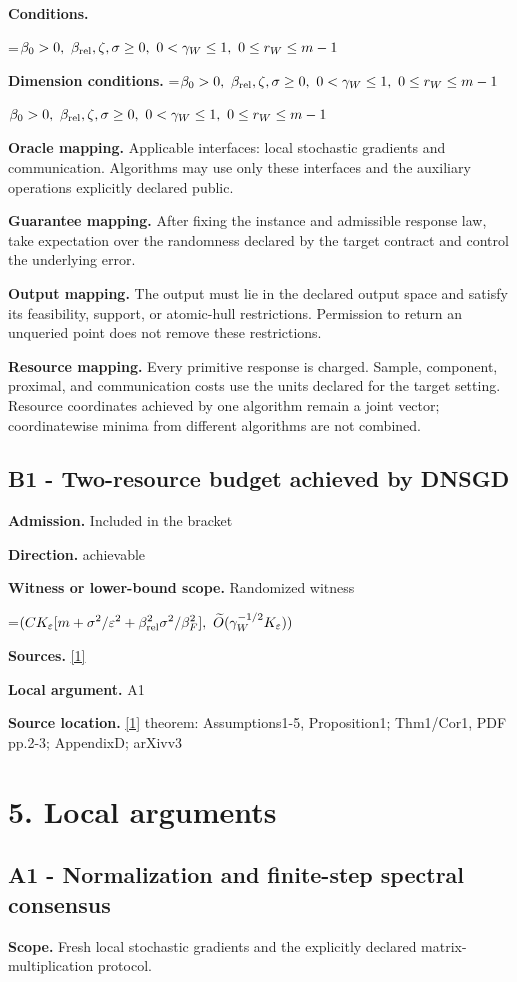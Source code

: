 \documentclass[10pt,a4paper]{article}
\newcommand{\AtlasMath}[1]{\par\begingroup\centering\setbox0=\hbox{$\displaystyle #1$}\ifdim\wd0>1.4\linewidth\typeout{ATLAS WIDE FORMULA: \the\wd0}\fi\ifdim\wd0>\linewidth\resizebox{\linewidth}{!}{\box0}\else\box0\fi\par\endgroup}
\newcommand{\AtlasInlineMath}[1]{\begingroup\setbox0=\hbox{$#1$}\ifdim\wd0>.4\linewidth\endgroup\AtlasMath{#1}\else\endgroup$#1$\fi}
\begin{document}
\textbf{Conditions.} 
\AtlasMath{\beta_0>0,\ \beta_{\rm rel},\zeta,\sigma\ge0,\ 0<\gamma_W\le1,\ 0\le r_W\le m-1}


\textbf{Dimension conditions.} \AtlasInlineMath{\beta_0>0,\ \beta_{\rm rel},\zeta,\sigma\ge0,\ 0<\gamma_W\le1,\ 0\le r_W\le m-1}

\textbf{Oracle mapping.} Applicable interfaces: local stochastic gradients and communication. Algorithms may use only these interfaces and the auxiliary operations explicitly declared public.

\textbf{Guarantee mapping.} After fixing the instance and admissible response law, take expectation over the randomness declared by the target contract and control the underlying error.

\textbf{Output mapping.} The output must lie in the declared output space and satisfy its feasibility, support, or atomic-hull restrictions. Permission to return an unqueried point does not remove these restrictions.

\textbf{Resource mapping.} Every primitive response is charged. Sample, component, proximal, and communication costs use the units declared for the target setting. Resource coordinates achieved by one algorithm remain a joint vector; coordinatewise minima from different algorithms are not combined.

\subsection{B1 - Two-resource budget achieved by DNSGD}
\textbf{Admission.} Included in the bracket

\textbf{Direction.} achievable

\textbf{Witness or lower-bound scope.} Randomized witness

\AtlasMath{(CK_\varepsilon[m+\sigma^2/\varepsilon^2+\beta_{\rm rel}^2\sigma^2/\beta_F^2],\ \widetilde{O}(\gamma_W^{-1/2}K_\varepsilon))}
\textbf{Sources.} \href{https://arxiv.org/pdf/2509.08726}{[1]}

\textbf{Local argument.} A1

\textbf{Source location.} \href{https://arxiv.org/pdf/2509.08726}{[1]} theorem: Assumptions1-5, Proposition1; Thm1/Cor1, PDF pp.2-3; AppendixD; arXivv3

\section{5. Local arguments}
\subsection{A1 - Normalization and finite-step spectral consensus}
\textbf{Scope.} Fresh local stochastic gradients and the explicitly declared matrix-multiplication protocol.
\end{document}
